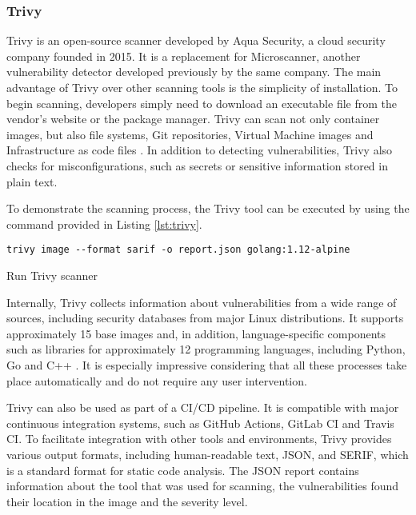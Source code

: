 \subsubsection{Trivy}

Trivy is an open-source scanner developed by Aqua Security, a cloud security company founded in 2015. It is a replacement for Microscanner, another vulnerability detector developed previously by the same company. The main advantage of Trivy over other scanning tools is the simplicity of installation. To begin scanning, developers simply need to download an executable file from the vendor's website or the package manager. Trivy can scan not only container images, but also file systems, Git repositories, Virtual Machine images and Infrastructure as code files \cite{d:trivystart}. In addition to detecting vulnerabilities, Trivy also checks for misconfigurations, such as secrets or sensitive information stored in plain text.

To demonstrate the scanning process, the Trivy tool can be executed by using the command provided in Listing \ref{lst:trivy}.

\begin{listing}[htp]
    \centering
    \begin{minipage}{0.75\linewidth}
        \begin{verbatim}
trivy image --format sarif -o report.json golang:1.12-alpine
        \end{verbatim}
    \end{minipage}
    \caption{Run Trivy scanner}
    \label{lst:trivy}
\end{listing}

Internally, Trivy collects information about vulnerabilities from a wide range of sources, including security databases from major Linux distributions. It supports approximately 15 base images and, in addition, language-specific components such as libraries for approximately 12 programming languages, including Python, Go and C++ \cite{d:trivyvulnerability}. It is especially impressive considering that all these processes take place automatically and do not require any user intervention.

Trivy can also be used as part of a CI/CD pipeline. It is compatible with major continuous integration systems, such as GitHub Actions, GitLab CI and Travis CI. To facilitate integration with other tools and environments, Trivy provides various output formats, including human-readable text, JSON, and SERIF, which is a standard format for static code analysis. The JSON report contains information about the tool that was used for scanning, the vulnerabilities found their location in the image and the severity level.

